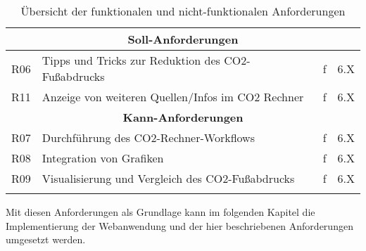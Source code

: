 \begin{longtable}{|c|l|c|c|}
    \multicolumn{4}{|c|}{\textbf{Soll-Anforderungen}}                                    \\ \hline

    R06                  & Tipps und Tricks zur Reduktion des CO2-Fußabdrucks & f  & 6.X \\ \hline
    R11                  & Anzeige von weiteren Quellen/Infos im CO2 Rechner  & f  & 6.X \\ \hline

    \multicolumn{4}{|c|}{\textbf{Kann-Anforderungen}}                                    \\ \hline

    R07                  & Durchführung des CO2-Rechner-Workflows             & f  & 6.X \\ \hline
    R08                  & Integration von Grafiken                           & f  & 6.X \\ \hline
    R09                  & Visualisierung und Vergleich des CO2-Fußabdrucks   & f  & 6.X \\ \hline
    \caption{Übersicht der funktionalen und nicht-funktionalen Anforderungen}
    \\
\end{longtable}



Mit diesen Anforderungen als Grundlage kann im folgenden Kapitel die Implementierung der Webanwendung und der hier beschriebenen Anforderungen umgesetzt werden.

